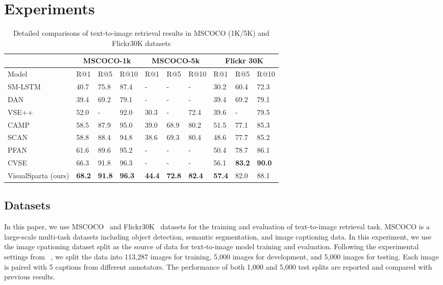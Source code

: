 \documentclass[11pt,a4paper]{article}
\begin{document}
%
 
\section{Experiments}
\begin{table*}[!ht]
\centering
\begin{tabular}{l|lll|lll|lll}\hline \hline 
 & \multicolumn{3}{c}{MSCOCO-1k}&  \multicolumn{3}{c}{MSCOCO-5k}& \multicolumn{3}{c}{Flickr 30K} \\ \hline 


 Model & R@1 & R@5 & R@10 & R@1 & R@5 & R@10 & R@1 & R@5 & R@10 \\ \hline  
 
SM-LSTM~\cite{huang2017instance} & 40.7 & 75.8 & 87.4 & - & - & - & 30.2 & 60.4 & 72.3\\
DAN~\cite{nam2017dual} & 39.4 & 69.2 & 79.1 & - & - & - & 39.4 & 69.2 & 79.1\\
VSE++~\cite{faghri2017vse++} & 52.0 & - & 92.0 & 30.3 & - & 72.4 & 39.6 & - & 79.5\\
CAMP~\cite{wang2019camp} & 58.5 & 87.9 & 95.0 & 39.0 & 68.9 & 80.2 & 51.5 & 77.1 & 85.3\\
SCAN~\cite{lee2018stacked} & 58.8 & 88.4 & 94.8 & 38.6 & 69.3 & 80.4 & 48.6 & 77.7 & 85.2\\
PFAN~\cite{wang2019position} & 61.6 & 89.6 & 95.2 & - & - & - & 50.4 & 78.7 & 86.1 \\ 
CVSE~\cite{wang2020consensus} & 66.3 & 91.8 & 96.3 & - & - & - & 56.1 & \textbf{83.2} & \textbf{90.0} \\ \hline
VisualSparta (ours) & \textbf{68.2} & \textbf{91.8} & \textbf{96.3} & \textbf{44.4} & \textbf{72.8} & \textbf{82.4} &  \textbf{57.4} & 82.0 & 88.1 \\ \hline



\end{tabular}
\caption{Detailed comparisons of text-to-image retrieval results in MSCOCO (1K/5K) and Flickr30K datasets}
\label{tbl:visualsparta-score}

\end{table*}

\subsection{Datasets}
In this paper, we use MSCOCO~\cite{lin2014microsoft} and Flickr30K~\cite{plummer2015flickr30k} datasets for the training and evaluation of text-to-image retrieval task. MSCOCO is a large-scale multi-task datasets including object detection, semantic segmentation, and image captioning data. In this experiment, we use the image cpationing dataset split as the source of data for text-to-image model training and evaluation. Following the experimental settings from ~\citet{karpathy2015deep}, we split the data into 113,287 images for training, 5,000 images for development, and 5,000 images for testing. Each image is paired with 5 captions from different annotators. The performance of both 1,000 and 5,000 test splits are reported and compared with previous results.
\end{document}
